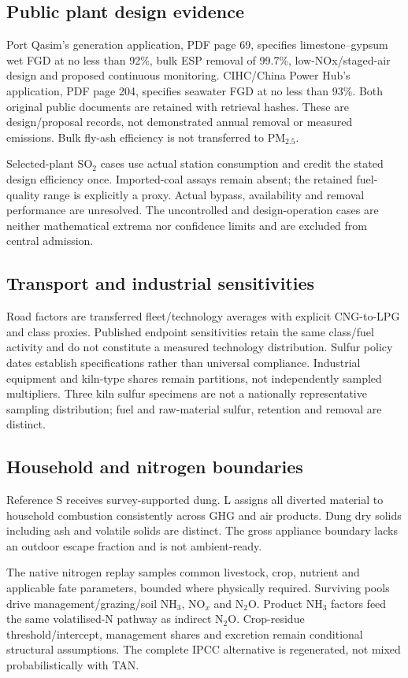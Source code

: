 \documentclass[a4paper,11pt]{article}
\begin{document}
\subsection{Public plant design evidence}
Port Qasim's generation application, PDF page 69, specifies limestone--gypsum wet FGD at no less than 92\%, bulk ESP removal of 99.7\%, low-NOx/staged-air design and proposed continuous monitoring. CIHC/China Power Hub's application, PDF page 204, specifies seawater FGD at no less than 93\%. Both original public documents are retained with retrieval hashes. These are design/proposal records, not demonstrated annual removal or measured emissions. Bulk fly-ash efficiency is not transferred to PM$_{2.5}$.

Selected-plant SO$_2$ cases use actual station consumption and credit the stated design efficiency once. Imported-coal assays remain absent; the retained fuel-quality range is explicitly a proxy. Actual bypass, availability and removal performance are unresolved. The uncontrolled and design-operation cases are neither mathematical extrema nor confidence limits and are excluded from central admission.

\subsection{Transport and industrial sensitivities}
Road factors are transferred fleet/technology averages with explicit CNG-to-LPG and class proxies. Published endpoint sensitivities retain the same class/fuel activity and do not constitute a measured technology distribution. Sulfur policy dates establish specifications rather than universal compliance. Industrial equipment and kiln-type shares remain partitions, not independently sampled multipliers. Three kiln sulfur specimens are not a nationally representative sampling distribution; fuel and raw-material sulfur, retention and removal are distinct.

\subsection{Household and nitrogen boundaries}
Reference S receives survey-supported dung. L assigns all diverted material to household combustion consistently across GHG and air products. Dung dry solids including ash and volatile solids are distinct. The gross appliance boundary lacks an outdoor escape fraction and is not ambient-ready.

The native nitrogen replay samples common livestock, crop, nutrient and applicable fate parameters, bounded where physically required. Surviving pools drive management/grazing/soil NH$_3$, NO$_x$ and N$_2$O. Product NH$_3$ factors feed the same volatilised-N pathway as indirect N$_2$O. Crop-residue threshold/intercept, management shares and excretion remain conditional structural assumptions. The complete IPCC alternative is regenerated, not mixed probabilistically with TAN.
\end{document}
